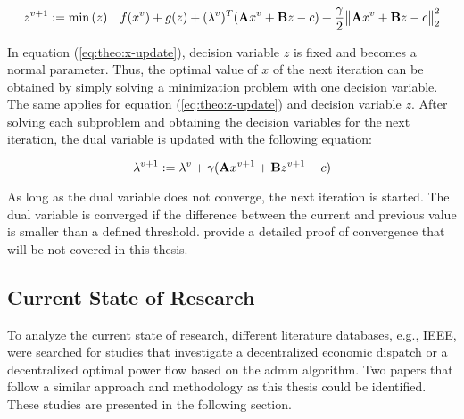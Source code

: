 \begin{equation}
	z^{v+1} := \min{(z)} \quad f(x^v) + g(z) + (\lambda^v)^T(\vb{A}x^v + \vb{B}z - c) + \frac{\gamma}{2}\big\| \vb{A}x^v + \vb{B}z - c \big\|^2_2 \label{eq:theo:z-update}
\end{equation}

In equation (\ref{eq:theo:x-update}), decision variable $z$ is fixed and becomes a normal parameter. Thus, the optimal value of $x$ of the next iteration can be obtained by simply solving a minimization problem with one decision variable. The same applies for equation (\ref{eq:theo:z-update}) and decision variable $z$. After solving each subproblem and obtaining the decision variables for the next iteration, the dual variable is updated with the following equation: 

\begin{equation}
	\lambda^{v+1} :=  \lambda^{v} + \gamma(\vb{A}x^{v+1} + \vb{B}z^{v+1} - c)
\end{equation}

As long as the dual variable does not converge, the next iteration is started. The dual variable is converged if the difference between the current and previous value is smaller than a defined threshold. \citet{boyd2010} provide a detailed proof of convergence that will be not covered in this thesis.

\subsection{Current State of Research}

To analyze the current state of research, different literature databases, e.g., IEEE, were searched for studies that investigate a decentralized economic dispatch or a decentralized optimal power flow based on the \gls{admm} algorithm. Two papers that follow a similar approach and methodology as this thesis could be identified. These studies are presented in the following section. \\

